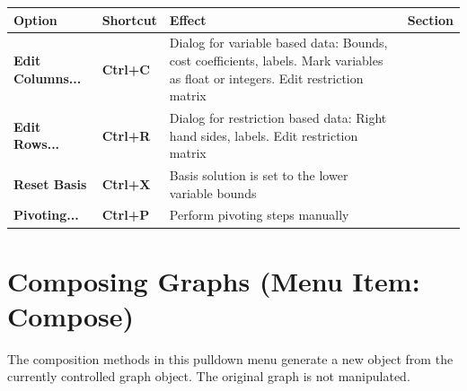 \documentclass[a4paper,11pt,twoside]{book}
\begin{document}
\begin{tabular}{p{3.5cm}|p{2cm}|p{17.5cm}|p{1.5cm}} 
\large\bf Option &  \large\bf Shortcut & \large\bf Effect & \large\bf Section \\
[1mm] \hline \hline
\bf Edit Columns... &\bf Ctrl+C &
    Dialog for variable based data: Bounds, cost coefficients, labels.
    Mark variables as float or integers. Edit restriction matrix \\ \hline
\bf Edit Rows... &\bf Ctrl+R & 
    Dialog for restriction based data: Right hand sides, labels.
    Edit restriction matrix \\ \hline
\bf Reset Basis & \bf Ctrl+X &
    Basis solution is set to the lower variable bounds \\ \hline
\bf Pivoting... & \bf Ctrl+P &
    Perform pivoting steps manually
\end{tabular}


\vfill
\section{Composing Graphs (Menu Item: Compose)}

The composition methods in this pulldown menu generate a new object from the
currently controlled graph object. The original graph is not manipulated.
\end{document}
